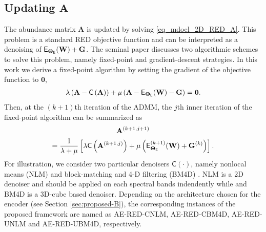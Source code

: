 \documentclass[journal,a4paper]{IEEEtran}
\newcommand{\bTheta}{\boldsymbol{\Theta}}
\newcommand{\MATabund}{\mathbf{A}}
\begin{document}
\subsection{Updating $\MATabund$}
The abundance matrix $\MATabund$ is updated by solving \eqref{eq_mdoel_2D_RED_A}.
This problem is a standard RED objective function and can be interpreted as a denoising of $\mathsf{E}_{\bTheta_{\sf E}}(\mathbf{W})+\mathbf{G}$. The seminal paper \cite{romano2017little} discusses two algorithmic schemes to solve this problem, namely fixed-point and gradient-descent strategies. In this work we derive a fixed-point algorithm by setting the gradient of the objective function to $\boldsymbol{0}$,
\begin{equation}
\begin{aligned}\label{eq_mdoel_2D_RED_Ag}
  \lambda \left(\MATabund-\mathsf{C}\left(\MATabund\right)\right)+\mu\left(\MATabund-\mathsf{E}_{\bTheta_{\sf E}}(\mathbf{W})-\mathbf{G}\right)=\boldsymbol{0}.
\end{aligned}
\end{equation}
Then, at the $(k+1)$th iteration of the ADMM, the $j$th inner iteration of the fixed-point algorithm can be summarized as
\begin{multline}
\label{eq_mdoel_2D_RED_Ag_f}
  \MATabund^{(k+1,j+1)}\\
  =\frac{1}{\lambda+\mu}\left[\lambda \mathsf{C}\left(\MATabund^{(k+1,j)}\right)
  +\mu\left(\mathsf{E}^{(k+1)}_{\bTheta_{\sf E}}(\mathbf{W})+\mathbf{G}^{(k)}\right)\right].
\end{multline}
For illustration, we consider two particular denoisers $\mathsf{C}\left(\cdot\right)$, namely nonlocal means (NLM) \cite{buades2011non} and block-matching and 4-D filtering (BM4D) \cite{maggioni2012nonlocal}. NLM is a 2D denoiser and should be applied on each spectral bands indendently while and BM4D is a 3D-cube based denoiser. Depending on the architecture chosen for the encoder (see Section \ref{sec:proposed-B}), the corresponding instances of the proposed framework are named as AE-RED-CNLM, AE-RED-CBM4D, AE-RED-UNLM and AE-RED-UBM4D, respectively.

\end{document}
